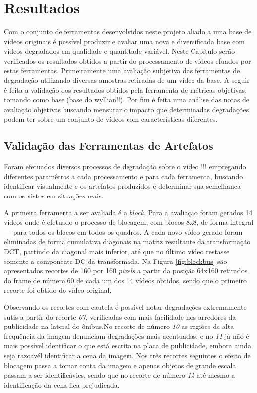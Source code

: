
\chapter{Resultados} %

Com o conjunto de ferramentas desenvolvidos neste projeto aliado a uma base de vídeos originais é possível produzir e avaliar uma nova e diversificada base com vídeos degradados em qualidade e quantitade variável.
Neste Capítulo serão verificados os resultados obtidos a partir do processamento de vídeos efuados por estas ferramentas. Primeiramente uma avaliação subjetiva das ferramentas de degradação utilizando diversas amostras retiradas de um vídeo da base. A seguir é feita a validação dos resultados obtidos pela ferramenta de métricas objetivas, tomando como base (base do wyllian!!).
Por fim é feita uma análise das notas de avaliação objetivas buscando mensurar o impacto que determinadas degradações podem ter sobre um conjunto de vídeos com características diferentes.

\section{Validação das Ferramentas de Artefatos}

Foram efetuados diversos processos de degradação sobre o vídeo !!! empregando diferentes paramêtros a cada processamento e para cada ferramenta, buscando identificar visualmente e os artefatos produzidos e determinar sua semelhanca com os vistos em situações reais.

A primeira ferramenta a ser avaliada é a \emph{block}.
Para a avaliação foram gerados 14 vídeos onde é efetuado o processo de blocagem, com blocos 8x8, de forma integral --- para todos os blocos em todos os quadros. A cada novo vídeo gerado foram eliminadas de forma cumulativa diagonais na matriz resultante da transformação DCT, partindo da diagonal mais inferior, até que no último vídeo restasse somente a componente DC da transformada. 
Na Figura \ref{fig:blockbus} são apresentados recortes de 160 por 160 \emph{pixels} a partir da posição 64x160 retirados do frame de número 60 de cada um dos 14 vídeos obtidos, sendo que o primeiro recorte foi obtido do vídeo original.

Observando os recortes com cautela é possível notar degradações extremamente sutis a partir do recorte \emph{07}, verificadas com mais facilidade nos arredores da publicidade na lateral do ônibus.No recorte de número \emph{10} as regiões de alta frequência da imagem denunciam degradações mais acentuadas, e no \emph{11} já não é mais possível identificar o que está escrito na placa de publicidade, embora ainda seja razoavél identificar a cena da imagem.
Nos três recortes seguintes o efeito de blocagem passa a tomar conta da imagem e apenas objetos de grande escala passam a ser identificávies, sendo que no recorte de número \emph{14} até mesmo a identificação da cena fica prejudicada.

